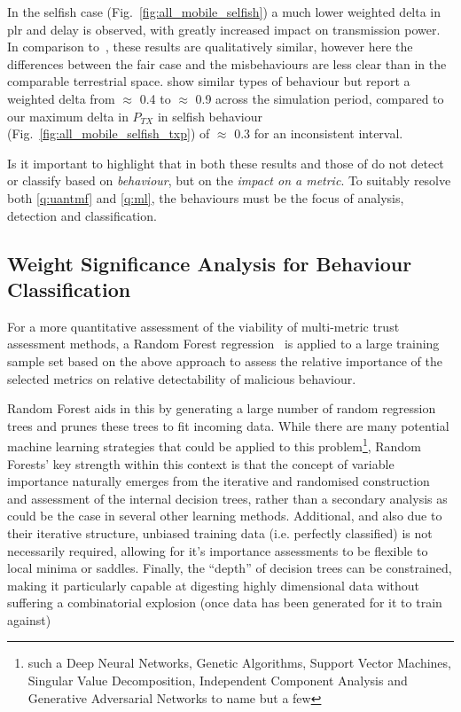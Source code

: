In the selfish case (Fig.~\ref{fig:all_mobile_selfish}) a much lower weighted delta in \gls{plr} and delay is observed, with greatly increased impact on transmission power.
In comparison to~\cite{Guo11}, these results are qualitatively similar, however here the differences between the fair case and the misbehaviours are less clear than in the comparable terrestrial space.
\citet{Guo11} show similar types of behaviour but report a weighted delta from $\approx$ 0.4 to $\approx$ 0.9 across the simulation period, compared to our maximum delta in $P_{TX}$ in selfish behaviour (Fig.~\ref{fig:all_mobile_selfish_txp}) of $\approx$ 0.3 for an inconsistent interval.

Is it important to highlight that in both these results and those of \citet{Guo11} do not detect or classify based on \emph{behaviour}, but on the \emph{impact on a metric}.
To suitably resolve both \autoref{q:uantmf} and \autoref{q:ml}, the behaviours must be the focus of analysis, detection and classification.

\subsection{Weight Significance Analysis for Behaviour Classification}\label{sec:metric_significance}

For a more quantitative assessment of the viability of multi-metric trust assessment methods, a Random Forest regression~\cite{Breiman2001} is applied to a large training sample set based on the above approach to assess the relative importance of the selected metrics on relative detectability of malicious behaviour.

Random Forest aids in this by generating a large number of random regression trees and prunes these trees to fit incoming data.
While there are many potential machine learning strategies that could be applied to this problem\footnote{such a Deep Neural Networks, Genetic Algorithms, Support Vector Machines, Singular Value Decomposition, Independent Component Analysis and Generative Adversarial Networks to name but a few}, Random Forests' key strength within this context is that the concept of variable importance naturally emerges from the iterative and randomised construction and assessment of the internal decision trees, rather than a secondary analysis as could be the case in several other learning methods\cite{Altmann2010, Ho2002}. Additional, and also due to their iterative structure, unbiased training data (i.e. perfectly classified) is not necessarily required, allowing for it's importance assessments to be flexible to local minima or saddles. Finally, the ``depth'' of decision trees can be constrained, making it particularly capable at digesting highly dimensional data without suffering a combinatorial explosion (once data has been generated for it to train against)

